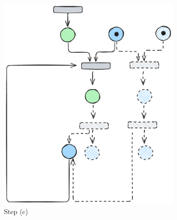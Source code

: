 \begin{figure}[htbp]
	\begin{subfigure}[b]{0.30\textwidth}
		\centering
		\includegraphics[width=\textwidth]{plots/bidirectional_pruning_step_c_backward.pdf}
		\caption{Step (c)}\label{fig:step:c}
	\end{subfigure}\hfill
	\begin{subfigure}[b]{0.23\textwidth}
		\centering

\end{subfigure}
\end{figure}
